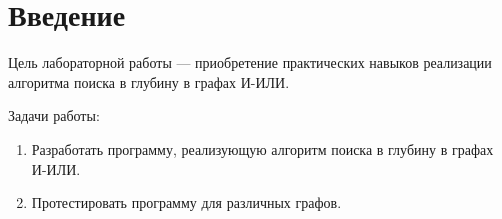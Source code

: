 \chapter*{Введение}

Цель лабораторной работы --- приобретение практических навыков реализации алгоритма поиска в глубину в графах И-ИЛИ.

Задачи работы:
\begin{enumerate}
    \item Разработать программу, реализующую алгоритм поиска в глубину в графах И-ИЛИ.
    \item Протестировать программу для различных графов.
\end{enumerate}
